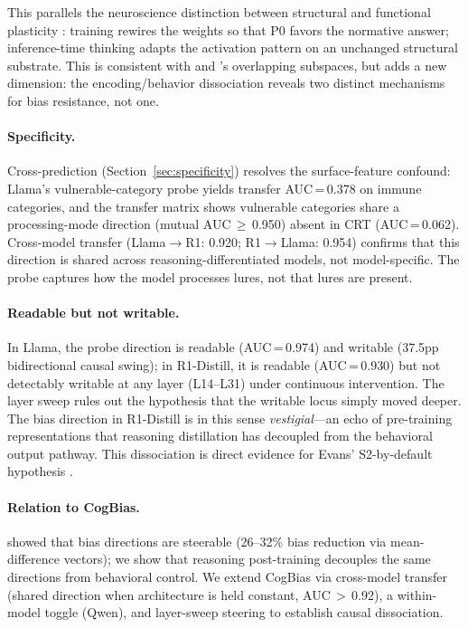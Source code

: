 \documentclass[twocolumn,10pt]{article}
\begin{document}
This parallels the neuroscience distinction between structural and
functional plasticity \citep{kolb2013brain}: training rewires the weights
so that P0 favors the normative answer; inference-time thinking adapts
the activation pattern on an unchanged structural substrate.  This is
consistent with \citet{ziabari2025reasoning} and
\citet{codaforno2025dual}'s overlapping subspaces, but adds a new
dimension: the encoding/behavior dissociation reveals two distinct
mechanisms for bias resistance, not one.

\paragraph{Specificity.}
Cross-prediction (Section~\ref{sec:specificity}) resolves the
surface-feature confound: Llama's vulnerable-category probe yields
transfer AUC\,=\,0.378 on immune categories, and the transfer matrix
shows vulnerable categories share a processing-mode direction
(mutual AUC\,$\geq$\,0.950) absent in CRT (AUC\,=\,0.062).
Cross-model transfer (Llama$\to$R1: 0.920; R1$\to$Llama: 0.954)
confirms that this direction is shared across reasoning-differentiated
models, not model-specific.  The probe captures how the model processes
lures, not that lures are present.

\paragraph{Readable but not writable.}
In Llama, the probe direction is readable (AUC\,=\,0.974) and writable
(37.5pp bidirectional causal swing); in R1-Distill, it is readable
(AUC\,=\,0.930) but not detectably writable at any layer (L14--L31)
under continuous intervention.  The layer sweep rules out the hypothesis
that the writable locus simply moved deeper.  The bias direction in
R1-Distill is in this sense \emph{vestigial}---an echo of pre-training
representations that reasoning distillation has decoupled from the
behavioral output pathway.  This dissociation is direct evidence for
Evans' S2-by-default hypothesis \citep{evans2019reflections}.

\paragraph{Relation to CogBias.}
\citet{huang2026cogbias} showed that bias directions are steerable
(26--32\% bias reduction via mean-difference vectors); we show that
reasoning post-training decouples the same directions from behavioral
control.  We extend CogBias via cross-model transfer (shared direction
when architecture is held constant, AUC\,$>$\,0.92), a within-model
toggle (Qwen), and layer-sweep steering to establish causal
dissociation.
\end{document}
